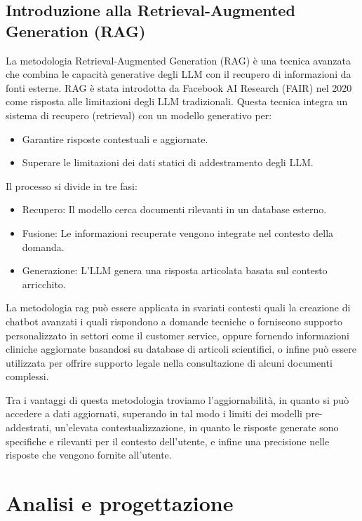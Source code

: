\documentclass[a4paper,twoside,12pt]{toptesi}
\begin{document}
\section{Introduzione alla Retrieval-Augmented Generation (RAG)}
La metodologia Retrieval-Augmented Generation (RAG) è una tecnica avanzata che combina le capacità generative degli LLM con il recupero di informazioni da fonti esterne. RAG è stata introdotta da Facebook AI Research (FAIR) nel 2020 come risposta alle limitazioni degli LLM tradizionali. Questa tecnica integra un sistema di recupero (retrieval) con un modello generativo per:

\begin{itemize}
\item Garantire risposte contestuali e aggiornate.
\item Superare le limitazioni dei dati statici di addestramento degli LLM.
\end{itemize}

Il processo si divide in tre fasi:
\begin{itemize}
\item Recupero: Il modello cerca documenti rilevanti in un database esterno.
\item Fusione: Le informazioni recuperate vengono integrate nel contesto della domanda.
\item Generazione: L'LLM genera una risposta articolata basata sul contesto arricchito.
\end{itemize}

La metodologia rag può essere applicata in svariati contesti quali la creazione di chatbot avanzati i quali rispondono a domande tecniche o forniscono supporto personalizzato in settori come il customer service, oppure fornendo informazioni cliniche aggiornate basandosi su database di articoli scientifici, o infine può essere utilizzata per offrire supporto legale nella consultazione di alcuni documenti complessi.

Tra i vantaggi di questa metodologia troviamo l'aggiornabilità, in quanto si può accedere a dati aggiornati, superando in tal modo i limiti dei modelli pre-addestrati, un'elevata contestualizzazione, in quanto le risposte generate sono specifiche e rilevanti per il contesto dell'utente, e infine una precisione nelle risposte che vengono fornite all'utente.

\chapter{Analisi e progettazione}
\end{document}
